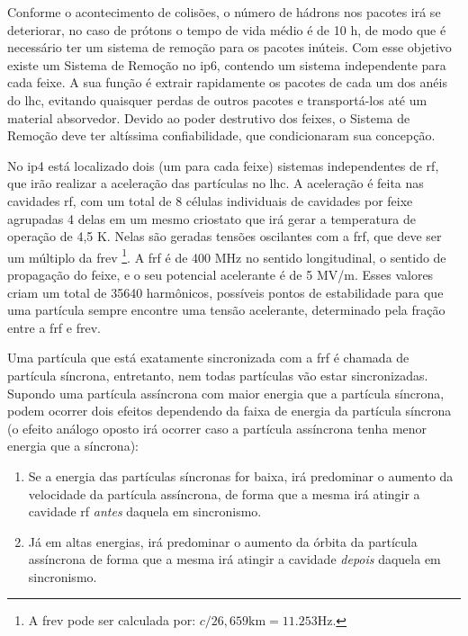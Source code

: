 Conforme o acontecimento de colisões, o número de hádrons nos pacotes irá se
deteriorar, no caso de prótons o tempo de vida médio é de 10 h, de modo que é necessário ter um 
sistema de remoção para os pacotes inúteis. Com esse objetivo existe um Sistema de Remoção no
\gls{ip}6, contendo um sistema independente para cada feixe. 
A sua função é extrair rapidamente os pacotes de cada um dos anéis do \gls{lhc}, evitando quaisquer
perdas de outros pacotes e transportá-los até um material
absorvedor. Devido ao poder destrutivo dos feixes, o Sistema de Remoção deve ter
altíssima confiabilidade, que condicionaram sua concepção.

No \gls{ip}4 está localizado dois (um para cada feixe) sistemas independentes de \gls{rf}, 
que irão realizar a aceleração das partículas no \gls{lhc}. A
aceleração é feita nas cavidades \gls{rf}, com um total de 8 células individuais 
de cavidades por feixe agrupadas 4 delas em um mesmo criostato 
que irá gerar a temperatura de operação de 4,5 K. Nelas são geradas tensões oscilantes
com a \gls{frf}, que deve ser um múltiplo da \gls{frev}
\footnote{A \gls{frev} pode ser calculada por: $c/26,659\text{km}=11.253
\text{Hz}$.}.  A \gls{frf} é de 400 MHz no sentido longitudinal, 
o sentido de propagação do feixe, e o seu potencial acelerante é de 5 MV/m.
Esses valores criam um total de 35640
harmônicos, possíveis pontos de estabilidade para que uma partícula 
sempre encontre uma tensão acelerante, determinado
pela fração entre a \gls{frf} e \gls{frev}. 

Uma partícula que está exatamente
sincronizada com a \gls{frf} é chamada de partícula síncrona, entretanto,
nem todas partículas vão estar sincronizadas. Supondo uma partícula assíncrona com maior
energia que a partícula síncrona, podem ocorrer dois efeitos dependendo da faixa
de energia da partícula síncrona (o efeito análogo oposto irá 
ocorrer caso a partícula assíncrona tenha menor energia que a síncrona):

\begin{enumerate}
\item Se a energia das partículas síncronas for baixa, irá predominar 
o aumento da velocidade da partícula assíncrona, de forma que a mesma irá
atingir a cavidade \gls{rf} \textit{antes} daquela em sincronismo.
\item Já em altas energias, irá predominar o aumento da órbita da partícula
assíncrona de forma que a mesma irá atingir a cavidade \textit{depois}
daquela em sincronismo.
\end{enumerate}

